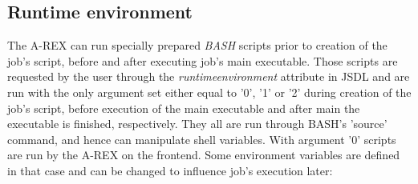 \documentclass{article}                            %
\begin{document}

\subsection{Runtime environment}

The A-REX can run specially prepared \emph{BASH} scripts prior to creation
of the job's script, before and after executing job's main executable.
Those scripts are requested by the user through the \emph{runtimeenvironment}
attribute in JSDL and are run with the only argument set either equal to '0',
'1' or '2' during creation of the job's script, before execution of the main
executable and after main the executable is finished, respectively. They all
are run through BASH's 'source' command, and hence can manipulate
shell variables. With argument '0' scripts are run by the A-REX on the
frontend. Some environment variables are defined in that case and
can be changed to influence job's execution later:
\end{document}

